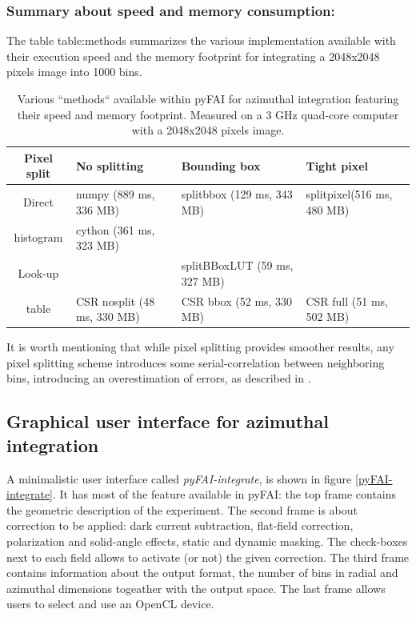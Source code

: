 \documentclass[preprint]{iucr}
\begin{document}
\subsubsection{Summary about speed and memory consumption:}

The table {table:methods}  summarizes the various implementation available
with their execution speed and the memory footprint for integrating a 2048x2048
pixels image into 1000 bins.

\begin{table}
\caption{Various ``methods`` available within pyFAI for azimuthal integration
featuring their speed and memory footprint. Measured on a 3 GHz quad-core
computer with a 2048x2048 pixels image.}
\begin{tabular}[pos]{|c|l|l|l|}
\hline
Pixel split& No splitting & Bounding box & Tight pixel \\
\hline
Direct    & numpy (889 ms, 336 MB) & splitbbox (129 ms, 343 MB) &
splitpixel(516 ms, 480 MB)\\
histogram & cython (361 ms, 323 MB) &                       &                \\
\hline
Look-up   &       & splitBBoxLUT (59 ms, 327 MB) &    \\
table     & CSR nosplit (48 ms, 330 MB)       & CSR bbox (52 ms, 330
MB) & CSR full (51 ms, 502 MB)\\
\hline
\end{tabular}
\label{table:methods}
\end{table}

It is worth mentioning that while pixel splitting provides smoother results, any
pixel splitting scheme introduces some serial-correlation between
neighboring bins, introducing an overestimation of errors, as described in \cite{billinge2014}.

\subsection{Graphical user interface for azimuthal integration}

A minimalistic user interface called \textit{pyFAI-integrate}, is
shown in figure \ref{pyFAI-integrate}.
It has most of the feature available in pyFAI:
the top frame contains the geometric description of the experiment.
The second frame is about correction to be applied: dark current subtraction,
flat-field correction, polarization and solid-angle effects, static and dynamic
masking. The check-boxes next to each field allows to activate (or not) the
given correction.
The third frame contains information about the output format, the number of bins
in radial and azimuthal dimensions togeather with the output space.
The last frame allows users to select and use an OpenCL device.
\end{document}

